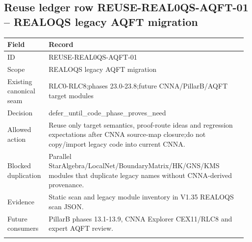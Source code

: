 \subsection*{Reuse ledger row REUSE-REAL0QS-AQFT-01 -- REALOQS legacy AQFT migration}
\begin{longtable}{L{0.16\linewidth} L{0.81\linewidth}}
\hline
\textbf{Field} & \textbf{Record}\\
\hline
ID & REUSE-REAL0QS-AQFT-01\\
\hline\addlinespace[0.20em]
Scope & REALOQS legacy AQFT migration\\
\hline\addlinespace[0.20em]
Existing canonical seam & RLC0-RLC8;\newline phases 23.0-23.8;\newline future CNNA/\allowbreak{}PillarB/\allowbreak{}AQFT target modules\\
\hline\addlinespace[0.20em]
Decision & defer\_until\_code\_phase\_proves\_need\\
\hline\addlinespace[0.20em]
Allowed action & Reuse only target semantics, proof-route ideas and regression expectations after CNNA source-map closure;\newline do not copy/\allowbreak{}import legacy code into current CNNA.\\
\hline\addlinespace[0.20em]
Blocked duplication & Parallel StarAlgebra/\allowbreak{}LocalNet/\allowbreak{}BoundaryMatrix/\allowbreak{}HK/\allowbreak{}GNS/\allowbreak{}KMS modules that duplicate legacy names without CNNA-derived provenance.\\
\hline\addlinespace[0.20em]
Evidence & Static scan and legacy module inventory in V1.35 REALOQS scan JSON.\\
\hline\addlinespace[0.20em]
Future consumers & PillarB phases 13.1-13.9, CNNA Explorer CEX11/\allowbreak{}RLC8 and expert AQFT review.\\
\hline\addlinespace[0.20em]
\end{longtable}
\normalsize
